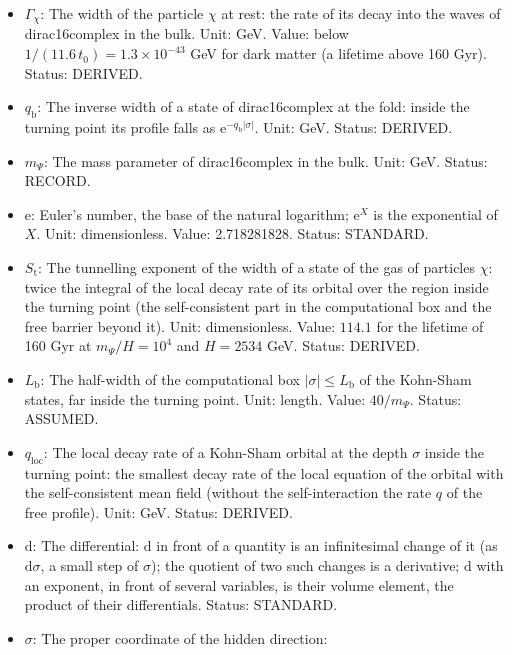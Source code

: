 \documentclass[
  10pt,
]{article}
\providecommand{\tightlist}{%
  \setlength{\itemsep}{0pt}\setlength{\parskip}{0pt}}
\begin{document}
\begin{itemize}
\tightlist
\item
  \(\Gamma_\chi\): The width of the particle \(\chi\) at rest: the rate
  of its decay into the waves of dirac16complex in the bulk. Unit: GeV.
  Value: below \(1/(11.6\,t_0) = 1.3\times10^{-43}\) GeV for dark matter
  (a lifetime above 160 Gyr). Status: DERIVED.
\item
  \(q_{\mathrm{b}}\): The inverse width of a state of dirac16complex at
  the fold: inside the turning point its profile falls as
  \(\mathrm{e}^{-q_{\mathrm{b}}\lvert\sigma\rvert}\). Unit: GeV. Status:
  DERIVED.
\item
  \(m_\Psi\): The mass parameter of dirac16complex in the bulk. Unit:
  GeV. Status: RECORD.
\item
  \(\mathrm{e}\): Euler's number, the base of the natural logarithm;
  \(\mathrm{e}^{X}\) is the exponential of \(X\). Unit: dimensionless.
  Value: 2.718281828. Status: STANDARD.
\item
  \(S_{\mathrm{t}}\): The tunnelling exponent of the width of a state of
  the gas of particles \(\chi\): twice the integral of the local decay
  rate of its orbital over the region inside the turning point (the
  self-consistent part in the computational box and the free barrier
  beyond it). Unit: dimensionless. Value: \(114.1\) for the lifetime of
  160 Gyr at \(m_\Psi/H = 10^4\) and \(H = 2534\) GeV. Status: DERIVED.
\item
  \(L_{\mathrm{b}}\): The half-width of the computational box
  \(\lvert\sigma\rvert \le L_{\mathrm{b}}\) of the Kohn-Sham states, far
  inside the turning point. Unit: length. Value: \(40/m_\Psi\). Status:
  ASSUMED.
\item
  \(q_{\mathrm{loc}}\): The local decay rate of a Kohn-Sham orbital at
  the depth \(\sigma\) inside the turning point: the smallest decay rate
  of the local equation of the orbital with the self-consistent mean
  field (without the self-interaction the rate \(q\) of the free
  profile). Unit: GeV. Status: DERIVED.
\item
  \(\mathrm{d}\): The differential: \(\mathrm{d}\) in front of a
  quantity is an infinitesimal change of it (as \(\mathrm{d}\sigma\), a
  small step of \(\sigma\)); the quotient of two such changes is a
  derivative; \(\mathrm{d}\) with an exponent, in front of several
  variables, is their volume element, the product of their
  differentials. Status: STANDARD.
\item
  \(\sigma\): The proper coordinate of the hidden direction:

\end{itemize}
\end{document}

